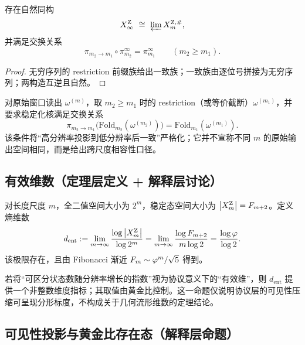 \begin{theorem}\label{thm:multiscale-inverse-limit}
存在自然同构
\[
X_\infty^{\mathrm Z}\ \cong\ \varprojlim X_m^{\mathrm Z,\#},
\]
并满足交换关系
\[
\pi_{m_2\to m_1}\circ \pi_{m_2}^\infty=\pi_{m_1}^\infty\qquad(m_2\ge m_1).
\]
\end{theorem}

\begin{proof}
无穷序列的 restriction 前缀族给出一致族；一致族由逐位号拼接为无穷序列；两构造互逆且自然。
\end{proof}

\begin{assumption}\label{assump:scale-compatibility}
对原始窗口读出 $\omega^{(m)}$，取 $m_2\ge m_1$ 时的 restriction（或等价截断）$\omega^{(m_1)}$，并要求稳定化核满足交换关系
\[
\pi_{m_2\to m_1}\bigl(\mathrm{Fold}_{m_2}(\omega^{(m_2)})\bigr)=\mathrm{Fold}_{m_1}(\omega^{(m_1)}).
\]
该条件将“高分辨率投影到低分辨率后一致”严格化；它并不宣称不同 $m$ 的原始输出空间相同，而是给出跨尺度相容性口径。
\end{assumption}

\subsection{有效维数（定理层定义 + 解释层讨论）}

\begin{definition}[符号可见空间的熵维数]\label{def:entropy-dimension}
对长度尺度 $m$，全二值空间大小为 $2^m$，稳定态空间大小为 $\left\lvert X_m^{\mathrm Z}\right\rvert=F_{m+2}$。定义熵维数
\[
d_{\mathrm{ent}}:=\lim_{m\to\infty}\frac{\log \left\lvert X_m^{\mathrm Z}\right\rvert}{\log 2^m}
=\lim_{m\to\infty}\frac{\log F_{m+2}}{m\log 2}
=\frac{\log\varphi}{\log 2}.
\]
该极限存在，且由 Fibonacci 渐近 $F_{m}\sim \varphi^m/\sqrt{5}$ 得到。
\end{definition}

\begin{remark}
若将“可区分状态数随分辨率增长的指数”视为协议意义下的“有效维”，则 $d_{\mathrm{ent}}$ 提供一个非整数维度指标；其取值由黄金比控制。这一命题仅说明协议层的可见性压缩可呈现分形标度，不构成关于几何流形维数的定理结论。
\end{remark}

\subsection{可见性投影与黄金比存在态（解释层命题）}

